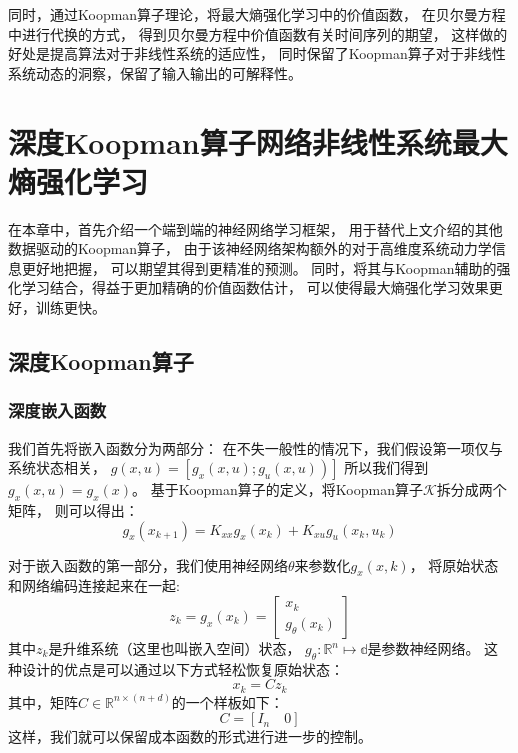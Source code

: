 \documentclass[AutoFakeBold]{LZUThesis}
\begin{document}
同时，通过Koopman算子理论，将最大熵强化学习中的价值函数，
在贝尔曼方程中进行代换的方式，
得到贝尔曼方程中价值函数有关时间序列的期望，
这样做的好处是提高算法对于非线性系统的适应性，
同时保留了Koopman算子对于非线性系统动态的洞察，保留了输入输出的可解释性。


\chapter{深度Koopman算子网络非线性系统最大熵强化学习}
在本章中，首先介绍一个端到端的神经网络学习框架，
用于替代上文介绍的其他数据驱动的Koopman算子，
由于该神经网络架构额外的对于高维度系统动力学信息更好地把握，
可以期望其得到更精准的预测。
同时，将其与Koopman辅助的强化学习结合，得益于更加精确的价值函数估计，
可以使得最大熵强化学习效果更好，训练更快。

\section{深度Koopman算子}
\subsection{深度嵌入函数}
我们首先将嵌入函数分为两部分：
在不失一般性的情况下，我们假设第一项仅与系统状态相关，
$\left.g(x, u)=\left[g_{x}(x, u) ; g_{u}(x, u)\right)\right]$
所以我们得到$g_x(x, u) = g_x(x)$。
基于Koopman算子的定义，将Koopman算子$\mathcal{K}$拆分成两个矩阵，
则可以得出：
\begin{equation}
  g_{x}\left(x_{k+1}\right)=K_{x x} g_{x}\left(x_{k}\right)+
  K_{x u} g_{u}\left(x_{k}, u_{k}\right)
\end{equation}

对于嵌入函数的第一部分，我们使用神经网络$\theta$来参数化$g_x(x, k)$，
将原始状态和网络编码连接起来在一起:
\begin{equation}
  z_{k}=g_{x}\left(x_{k}\right)=
  \left[\begin{array}{c}
  x_{k} \\
  g_{\theta}\left(x_{k}\right)
  \end{array}\right]
\end{equation}
其中$z_k$是升维系统（这里也叫嵌入空间）状态，
$g_\theta : \mathbb{R}^n \mapsto \mathbb{d}$是参数神经网络。
这种设计的优点是可以通过以下方式轻松恢复原始状态：
\begin{equation}
  x_k = C z_k
\end{equation}
其中，矩阵$C \in \mathbb{R}^{n \times (n + d)}$的一个样板如下：
\begin{equation}
  C = \left[ I_n \quad 0 \right]
\end{equation}
这样，我们就可以保留成本函数的形式进行进一步的控制。
\end{document}
